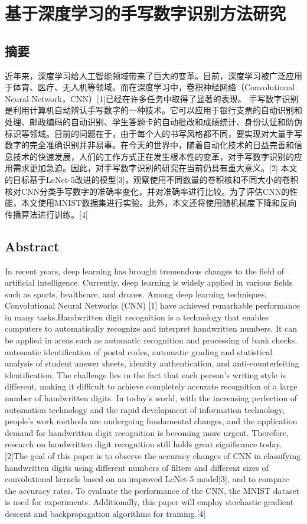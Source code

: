 \documentclass[11pt]{article}
\author{彭春友}
\date{\today}
\title{}
\begin{document}
\tableofcontents

\section{基于深度学习的手写数字识别方法研究}
\label{sec:orgecc2e5d}
\subsection{摘要}
\label{sec:org3b07989}
近年来，深度学习给人工智能领域带来了巨大的变革。目前，深度学习被广泛应用于体育、医疗、无人机等领域。而在深度学习中，卷积神经网络（Convolutional Neural Network，CNN）[1]已经在许多任务中取得了显著的表现。
手写数字识别是利用计算机自动辨认手写数字的一种技术。它可以应用于银行支票的自动识别和处理、邮政编码的自动识别、学生答题卡的自动批改和成绩统计、身份认证和防伪标识等领域。目前的问题在于，由于每个人的书写风格都不同，要实现对大量手写数字的完全准确识别并非易事。在今天的世界中，随着自动化技术的日益完善和信息技术的快速发展，人们的工作方式正在发生根本性的变革，对手写数字识别的应用需求更加急迫。因此，对手写数字识别的研究在当前仍具有重大意义。[2]
本文的目标基于LeNet-5改进的模型[3]，观察使用不同数量的卷积核和不同大小的卷积核对CNN分类手写数字的准确率变化，并对准确率进行比较。为了评估CNN的性能，本文使用MNIST数据集进行实验。此外，本文还将使用随机梯度下降和反向传播算法进行训练。[4]
\subsection{Abstract}
\label{sec:org96e47a6}
In recent years, deep learning has brought tremendous changes to the field of artificial intelligence. Currently, deep learning is widely applied in various fields such as sports, healthcare, and drones. Among deep learning techniques, Convolutional Neural Networks (CNN) [1] have achieved remarkable performance in many tasks.Handwritten digit recognition is a technology that enables computers to automatically recognize and interpret handwritten numbers. It can be applied in areas such as automatic recognition and processing of bank checks, automatic identification of postal codes, automatic grading and statistical analysis of student answer sheets, identity authentication, and anti-counterfeiting identification. The challenge lies in the fact that each person's writing style is different, making it difficult to achieve completely accurate recognition of a large number of handwritten digits. In today's world, with the increasing perfection of automation technology and the rapid development of information technology, people's work methods are undergoing fundamental changes, and the application demand for handwritten digit recognition is becoming more urgent. Therefore, research on handwritten digit recognition still holds great significance today. [2]The goal of this paper is to observe the accuracy changes of CNN in classifying handwritten digits using different numbers of filters and different sizes of convolutional kernels based on an improved LeNet-5 model[3], and to compare the accuracy rates. To evaluate the performance of the CNN, the MNIST dataset is used for experiments. Additionally, this paper will employ stochastic gradient descent and backpropagation algorithms for training.[4]
\end{document}
